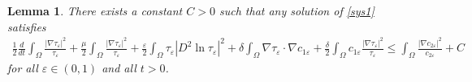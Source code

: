 \documentclass[a4paper,10pt]{article}
\newtheorem{Lemma}[Theorem]{Lemma}
\theoremstyle{definition}
\begin{document}
\begin{Lemma}
  \label{tau_lemma}
 There exists a constant $C > 0$ such that any solution of \eqref{sys1} satisfies
  \begin{align}
   \label{tau_ent}
    \frac{1}{2} \frac{d}{dt} \int_\Omega \frac{|\nabla \tau_\varepsilon|^2}{\tau_\varepsilon} +  \frac{\mu}{2} \int_\Omega \frac{|\nabla \tau_\varepsilon|^2}{\tau_\varepsilon} +\frac{\varepsilon}{2} \int_\Omega \tau_\varepsilon |D^2 \ln \tau_\varepsilon|^2 +  \delta \int_\Omega \nabla \tau_\varepsilon \cdot \nabla c_{1\varepsilon} + \frac{\delta}{2} \int_\Omega c_{1 \varepsilon}\frac{|\nabla \tau_\varepsilon|^2}{\tau_\varepsilon} \leq \int_\Omega \frac{|\nabla c_{2\varepsilon}|^2}{c_{2\varepsilon}} + C
  \end{align}
 for all $\varepsilon \in (0, 1)$ and all $t > 0$.
\end{Lemma}
\end{document}
